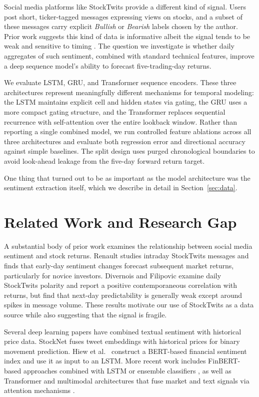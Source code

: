 \documentclass[10pt,twocolumn]{article}
\begin{document}
Social media platforms like StockTwits provide a different kind of signal. Users post short, ticker-tagged messages expressing views on stocks, and a subset of these messages carry explicit \textit{Bullish} or \textit{Bearish} labels chosen by the author. Prior work suggests this kind of data is informative albeit the signal tends to be weak and sensitive to timing \cite{renault2017intraday,divernois2023stocktwits}. The question we investigate is whether daily aggregates of such sentiment, combined with standard technical features, improve a deep sequence model's ability to forecast five-trading-day returns.

We evaluate LSTM, GRU, and Transformer sequence encoders. These three architectures represent meaningfully different mechanisms for temporal modeling: the LSTM maintains explicit cell and hidden states via gating, the GRU uses a more compact gating structure, and the Transformer replaces sequential recurrence with self-attention over the entire lookback window. Rather than reporting a single combined model, we run controlled feature ablations across all three architectures and evaluate both regression error and directional accuracy against simple baselines. The split design uses purged chronological boundaries to avoid look-ahead leakage from the five-day forward return target.

One thing that turned out to be as important as the model architecture was the sentiment extraction itself, which we describe in detail in Section~\ref{sec:data}.

\section{Related Work and Research Gap}

A substantial body of prior work examines the relationship between social media sentiment and stock returns. Renault \cite{renault2017intraday} studies intraday StockTwits messages and finds that early-day sentiment changes forecast subsequent market returns, particularly for novice investors. Divernois and Filipovic \cite{divernois2023stocktwits} examine daily StockTwits polarity and report a positive contemporaneous correlation with returns, but find that next-day predictability is generally weak except around spikes in message volume. These results motivate our use of StockTwits as a data source while also suggesting that the signal is fragile.

Several deep learning papers have combined textual sentiment with historical price data. StockNet \cite{xu2018stocknet} fuses tweet embeddings with historical prices for binary movement prediction. Hiew et al.\ \cite{hiew2019bert} construct a BERT-based financial sentiment index and use it as input to an LSTM. More recent work includes FinBERT-based approaches combined with LSTM or ensemble classifiers \cite{halder2022finbertlstm,liu2023stocktwitsfinbert}, as well as Transformer and multimodal architectures that fuse market and text signals via attention mechanisms \cite{kaeley2023transformer,hajek2025multimodal,pei2025cmtf}.
\end{document}
